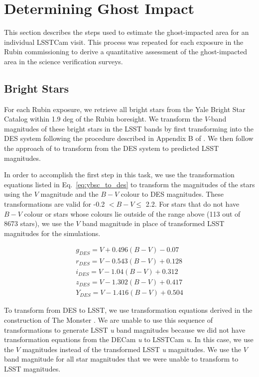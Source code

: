 \section{Determining Ghost Impact \label{sec:ghost_impact}}
This section describes the steps used to estimate the ghost-impacted area for an individual LSSTCam visit. This process was repeated for each exposure in the Rubin commissioning to derive a quantitative assessment of the ghost-impacted area in the science verification surveys.

\subsection{Bright Stars}
For each Rubin exposure, we retrieve all bright stars from the Yale Bright Star Catalog \citep{Hoffleit1991} within 1.9 deg of the Rubin boresight. We transform the $V$-band magnitudes of these bright stars in the LSST bands by first transforming into the DES system following the procedure described in Appendix B of \cite{2021ApJS..255...20A}. We then follow the approach of \cite{DMTN-277} to transform from the DES system to predicted LSST magnitudes. 

In order to accomplish the first step in this task, we use the transformation equations listed in Eq.~\ref{eq:ybsc_to_des} to transform the magnitudes of the stars using the $V$ magnitude and the $B-V$ colour to DES magnitudes. These transformations are valid for -0.2 $<B-V\leq $ 2.2. For stars that do not have $B-V$ colour or stars whose colours lie outside of the range above (113 out of 8673 stars), we use the $V$ band magnitude in place of transformed LSST magnitudes for the simulations.

\begin{equation}
\label{eq:ybsc_to_des}
    \begin{aligned}
        g_{DES} = V + 0.496 (B-V) -0.07  \\
        r_{DES} = V  -0.543 (B-V) + 0.128  \\
        i_{DES} = V -1.04 (B-V) +0.312 \\
        z_{DES} = V -1.302 (B-V) +0.417 \\
        Y_{DES} = V -1.416 (B-V) +0.504 
    \end{aligned}
\end{equation}

To transform from DES to LSST, we use transformation equations derived in the construction of The Monster \citep{DMTN-277}. 
We are unable to use this sequence of transformations to generate LSST {\it u} band magnitudes because we did not have transformation equations from the DECam {\it u} to LSSTCam {\it u}.  In this case, we use the $V$ magnitudes instead of the transformed LSST {\it u} magnitudes. 
We use the $V$ band magnitude for all star magnitudes that we were unable to transform to LSST magnitudes.

